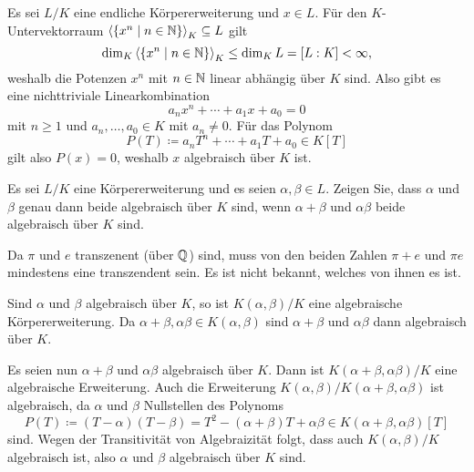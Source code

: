 \begin{solution}
  Es sei $L/K$ eine endliche Körpererweiterung und $x \in L$.
  Für den $K$-Untervektorraum $\left\langle  \{x^n \mid n \in \mathbb{N}\}  \right\rangle_K \subseteq L$ gilt
  \[
          \dim_K \left\langle  \{x^n \mid n \in \mathbb{N} \}  \right\rangle_K
    \leq  \dim_K L
    =     [L : K]
    <     \infty,
  \]
  weshalb die Potenzen $x^n$ mit $n \in \mathbb{N}$ linear abhängig über $K$ sind.
  Also gibt es eine nichttriviale Linearkombination
  \[
    a_n x^n + \dotsb + a_1 x + a_0 = 0
  \]
  mit $n \geq 1$ und $a_n, \dotsc, a_0 \in K$ mit $a_n \neq 0$.
  Für das Polynom
  \[
              P(T)
    \coloneqq a_n T^n + \dotsb + a_1 T + a_0
    \in       K[T]
  \]
  gilt also $P(x) = 0$, weshalb $x$ algebraisch über $K$ ist.
\end{solution}


\begin{question}
  Es sei $L/K$ eine Körpererweiterung und es seien $\alpha, \beta \in L$.
  Zeigen Sie, dass $\alpha$ und $\beta$ genau dann beide algebraisch über $K$ sind, wenn $\alpha + \beta$ und $\alpha \beta$ beide algebraisch über $K$ sind.
\end{question}


\begin{remark*}
  Da $\pi$ und $e$ transzenent (über $\mathbb{Q}$) sind, muss von den beiden Zahlen $\pi + e$ und $\pi e$ mindestens eine transzendent sein.
  Es ist nicht bekannt, welches von ihnen es ist.
\end{remark*}


\begin{solution}
  Sind $\alpha$ und $\beta$ algebraisch über $K$, so ist $K(\alpha, \beta) / K$ eine algebraische Körpererweiterung.
  Da $\alpha + \beta, \alpha \beta \in K(\alpha, \beta)$ sind $\alpha + \beta$ und $\alpha \beta$ dann algebraisch über $K$.
  
  Es seien nun $\alpha + \beta$ und $\alpha \beta$ algebraisch über $K$.
  Dann ist $K(\alpha + \beta, \alpha \beta)/K$ eine algebraische Erweiterung.
  Auch die Erweiterung $K(\alpha, \beta)/K(\alpha + \beta, \alpha \beta)$ ist algebraisch, da $\alpha$ und $\beta$ Nullstellen des Polynoms
  \[
              P(T)
    \coloneqq (T - \alpha)(T - \beta)
    =         T^2 - (\alpha + \beta)T + \alpha \beta
    \in       K(\alpha + \beta, \alpha \beta)[T]
  \]
  sind.
  Wegen der Transitivität von Algebraizität folgt, dass auch $K(\alpha,\beta)/K$ algebraisch ist, also $\alpha$ und $\beta$ algebraisch über $K$ sind.
\end{solution}


